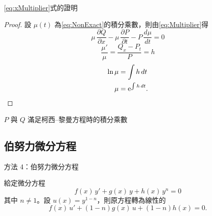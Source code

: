 \documentclass{beamer}
\newcommand  {\e}{\textup e}
\theoremstyle{remark}
\begin{document}
\begin{CJK}{UTF8}{bsmi}
\begin{frame}{\eqref{eq:xMultiplier}式的證明}
  \begin{proof}
    設 $\mu(t)$ 為\eqref{eq:NonExact}的積分乘數，則由\eqref{eq:Multiplier}得
    \[\mu\,\frac{\partial Q}{\partial x} - \mu\,\frac{\partial P}{\partial t} - P\,\frac{d\mu}{dt} = 0\]
    \[\frac{\mu'}{\mu} = \frac{Q_x - P_t}{P} = h\]
    \begin{align*}
      \ln \mu &= \int h\,dt\\
      \mu &= \e^{\int h\,dt}. \qedhere
    \end{align*}
  \end{proof}
\end{frame}

\begin{frame}{$P$ 與 $Q$ 滿足柯西--黎曼方程時的積分乘數}
\end{frame}

\subsection[伯努力]{伯努力微分方程}
\begin{frame}{方法 4：伯努力微分方程}
  \begin{theorem}
    給定微分方程
    \[f(x)\,y' + g(x)\,y + h(x)\,y^n = 0\]
    其中 $n \ne 1$。設 $u(x) = y^{1-n}$，則原方程轉為線性的
    \[f(x)\,u' + \left( 1-n \right) g(x)\,u + \left( 1-n \right) h(x) = 0.\]
  \end{theorem}
\end{frame}


\end{CJK}
\end{document}
